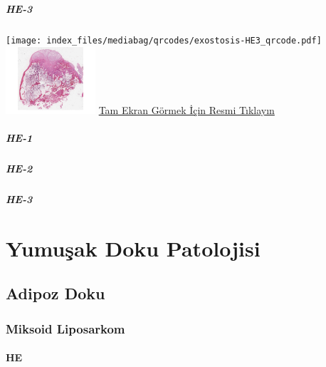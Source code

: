 \documentclass[
  letterpaper,
  DIV=11,
  numbers=noendperiod]{scrreprt}
\begin{document}
\hypertarget{he-3-1}{%
\subsubsection{HE-3}\label{he-3-1}}

\texttt{[image: index\_files/mediabag/qrcodes/exostosis-HE3\_qrcode.pdf]}
\href{https://images.patolojiatlasi.com/exostosis/oc002.html}{\includegraphics[width=0.25\textwidth,height=\textheight]{./screenshots/thumbnail_exostosis-3.png}}
\href{https://images.patolojiatlasi.com/exostosis/oc002.html}{Tam Ekran
Görmek İçin Resmi Tıklayın}

\hypertarget{he-1-2}{%
\subsubsection{HE-1}\label{he-1-2}}

\hypertarget{he-2-2}{%
\subsubsection{HE-2}\label{he-2-2}}

\hypertarget{he-3-2}{%
\subsubsection{HE-3}\label{he-3-2}}

\part{Yumuşak Doku Patolojisi}

\hypertarget{sec-adipoz-doku}{%
\chapter{Adipoz Doku}\label{sec-adipoz-doku}}

\hypertarget{sec-miksoid-liposarkom}{%
\section{Miksoid Liposarkom}\label{sec-miksoid-liposarkom}}

\hypertarget{he-11}{%
\subsection{HE}\label{he-11}}
\end{document}
